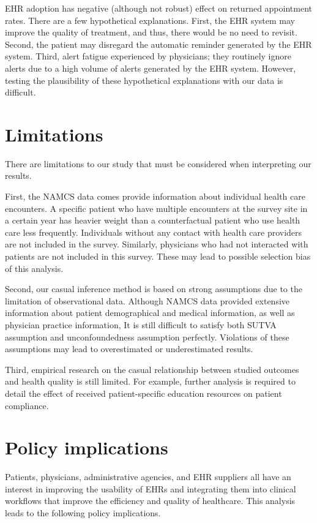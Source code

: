 \documentclass[12pt]{report}
\begin{document}
EHR adoption has negative (although not robust) effect on returned appointment rates. There are a few hypothetical explanations. First, the EHR system may improve the quality of treatment, and thus, there would be no need to revisit. Second, the patient may disregard the automatic reminder generated by the EHR system. Third, alert fatigue experienced by physicians; they routinely ignore alerts due to a high volume of alerts generated by the EHR system. However, testing the plausibility of these hypothetical explanations with our data is difficult.

\chapter{Limitations}
There are limitations to our study that must be considered when interpreting our results.

First, the NAMCS data comes provide information about individual health care encounters. A specific patient who have multiple encounters at the survey site in a certain year has heavier weight than a counterfactual patient who use health care less frequently. Individuals without any contact with health care providers are not included in the survey. Similarly, physicians who had not interacted with patients are not included in this survey. These may lead to possible selection bias of this analysis.

Second, our casual inference method is based on strong assumptions due to the limitation of observational data. Although NAMCS data provided extensive information about patient demographical and medical information, as well as physician practice information, It is still difficult to satisfy both SUTVA assumption and unconfoundedness assumption perfectly. Violations of these assumptions may lead to overestimated or underestimated results.

Third, empirical research on the casual relationship between studied outcomes and health quality is still limited. For example, further analysis is required to detail the effect of received patient-specific education resources on patient compliance.

\chapter{Policy implications}
Patients, physicians, administrative agencies, and EHR suppliers all have an interest in improving the usability of EHRs and integrating them into clinical workflows that improve the efficiency and quality of healthcare. This analysis leads to the following policy implications. 
\end{document}
